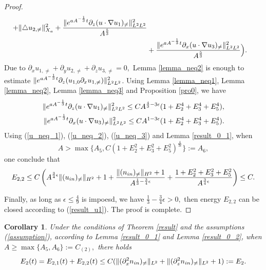 \documentclass[12pt, reqno]{amsart}
\newtheorem{corollary}{Corollary}[section]
\numberwithin{equation}{section}
\begin{document}
\begin{proof}
\begin{equation}
\begin{aligned}
				+\|\triangle u_{2,\neq}\|_{X_a}^2
				+\frac{
					\|{\rm e}^{aA^{-\frac{1}{3}}t}\partial_z(u\cdot\nabla u_1)_{\neq}\|_{L^2L^2}^2}{A^{\frac53}}\\
				&+\frac{
					\|{\rm e}^{aA^{-\frac{1}{3}}t}\partial_x(u\cdot\nabla u_3)_{\neq}\|_{L^2L^2}^2}{A^{\frac53}}\Big).
			\end{aligned}
		\end{equation}	
		Due to $\partial_xu_{1,\neq}+\partial_yu_{2,\neq}
		+\partial_zu_{3,\neq}=0,$ Lemma \ref{lemma_neq2} is enough to estimate 
		$\|{\rm e}^{aA^{-\frac{1}{3}}t}\partial_z(u_{1,0}\partial_x u_{1,\neq})\|_{L^2L^2}^2$.
		Using Lemma \ref{lemma_neq1}, Lemma \ref{lemma_neq2}, Lemma \ref{lemma_neq3} and Proposition \ref{pro0}, we
		have
		\begin{equation*}
			\begin{aligned}
				\|{\rm e}^{aA^{-\frac{1}{3}}t}\partial_z(u\cdot\nabla u_1)_{\neq}\|_{L^2L^2}^2
				\leq CA^{\frac43-3\epsilon}(1+E_2^4+E_3^4+E_5^4),\\
				\|{\rm e}^{aA^{-\frac{1}{3}}t}\partial_x(u\cdot\nabla u_3)_{\neq}\|_{L^2L^2}^2\leq CA^{1-3\epsilon}(1+E_2^4+E_3^4+E_5^4).
			\end{aligned}
		\end{equation*}
		Using (\ref{u_neq_1}), (\ref{u_neq_2}), (\ref{u_neq_3}) and Lemma \ref{result_0_1}, when 
		$$A>\max\{A_5, C(1+E_2^2+E_3^2+E_5^2)^{\frac{4}{3\epsilon}}\}:=A_6,$$
		one conclude that 
		\begin{equation}\label{result_u1}
			E_{2,2}\leq C\left(A^{\frac34\epsilon}\|(u_{\rm in})_{\neq}\|_{H^2}+1+\frac{\|(n_{\rm in})_{\neq}\|_{H^2}+1}{A^{\frac13-\frac34\epsilon}}+\frac{1+E_2^2+E_3^2+E_5^2}
			{A^{\frac34\epsilon}}\right)\leq C.
		\end{equation} 
		
		Finally, as long as $\epsilon\leq\frac49$ is impoesd, we have 
		$\frac{1}{3}-\frac{3}{4}\epsilon>0,$ then energy $E_{2,2}$ can be closed
		according to (\ref{result_u1}).
		The proof is complete.	
	\end{proof}
	
	\begin{corollary}
		Under the conditions of Theorem \ref{result} and the assumptions (\ref{assumption}),
		according to Lemma \ref{result_0_1} and Lemma \ref{result_0_2}, when $A\geq \max\{A_5,A_6\}:=C_{(2)},$
		there holds
		\begin{equation}
			E_2(t)=E_{2,1}(t)+E_{2,2}(t)\leq 
			C(\|(\partial_x^2n_{\rm in})_{\neq}\|_{L^2}
			+\|(\partial_z^2n_{\rm in})_{\neq}\|_{L^2}+1):=E_2.
		\end{equation}
	\end{corollary}
	
\end{document}
